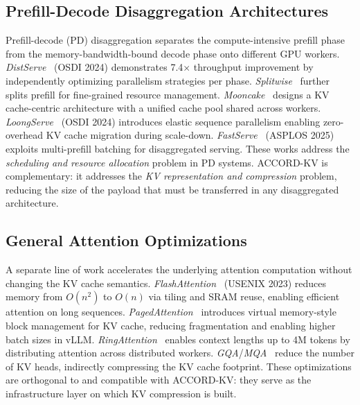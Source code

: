 \documentclass[11pt, a4paper, oneside]{article}
\theoremstyle{myplain}
\theoremstyle{mydefinition}
\theoremstyle{myremark}
\begin{document}
\subsection{Prefill-Decode Disaggregation Architectures}

Prefill-decode (PD) disaggregation separates the compute-intensive prefill phase from the memory-bandwidth-bound decode phase onto different GPU workers. \textit{DistServe}~\cite{zhong2024distserve} (OSDI 2024) demonstrates 7.4$\times$ throughput improvement by independently optimizing parallelism strategies per phase. \textit{Splitwise}~\cite{patel2024splitwise} further splits prefill for fine-grained resource management. \textit{Mooncake}~\cite{qin2024mooncake} designs a KV cache-centric architecture with a unified cache pool shared across workers. \textit{LoongServe}~\cite{zhang2024loongserve} (OSDI 2024) introduces elastic sequence parallelism enabling zero-overhead KV cache migration during scale-down. \textit{FastServe}~\cite{liu2025fastserve} (ASPLOS 2025) exploits multi-prefill batching for disaggregated serving. These works address the \textit{scheduling and resource allocation} problem in PD systems. ACCORD-KV is complementary: it addresses the \textit{KV representation and compression} problem, reducing the size of the payload that must be transferred in any disaggregated architecture.

\subsection{General Attention Optimizations}

A separate line of work accelerates the underlying attention computation without changing the KV cache semantics. \textit{FlashAttention}~\cite{dao2022flashattention} (USENIX 2023) reduces memory from $O(n^2)$ to $O(n)$ via tiling and SRAM reuse, enabling efficient attention on long sequences. \textit{PagedAttention}~\cite{kwon2023pagedattention} introduces virtual memory-style block management for KV cache, reducing fragmentation and enabling higher batch sizes in vLLM. \textit{RingAttention}~\cite{liu2023ringattention} enables context lengths up to 4M tokens by distributing attention across distributed workers. \textit{GQA}/\textit{MQA}~\cite{shazeer2019mqa,ainslie2023gqa} reduce the number of KV heads, indirectly compressing the KV cache footprint. These optimizations are orthogonal to and compatible with ACCORD-KV: they serve as the infrastructure layer on which KV compression is built.
\end{document}
